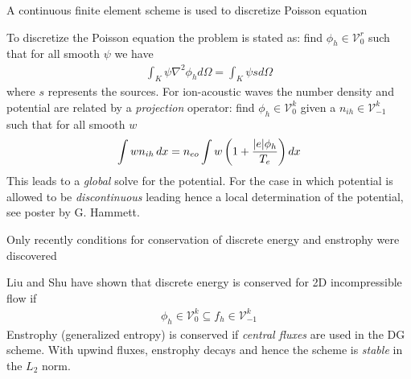 \documentclass[pdf]{beamer}
\theoremstyle{definition}
\begin{document}
\begin{frame}{A continuous finite element scheme is used to discretize
    Poisson equation}

  To discretize the Poisson equation the problem is stated as: find
  $\phi_h \in \mathcal{V}^r_0$ such that for all smooth $\psi$ we have
  \begin{align*}
    \int_K \psi \nabla^2 \phi_h d\Omega = \int_K \psi s d\Omega
  \end{align*}
  where $s$ represents the sources. For ion-acoustic waves the number
  density and potential are related by a \emph{projection} operator:
  find $\phi_h \in \mathcal{V}^k_0$ given a $n_{ih} \in
  \mathcal{V}_{-1}^k$ such that for all smooth $w$
  \begin{align*}
    \int w n_{ih}\thinspace dx = 
    n_{eo}\int w \left(1 + \frac{|e|\phi_h}{T_e}\right) dx
  \end{align*}
  This leads to a \emph{global} solve for the potential. For the case
  in which potential is allowed to be \emph{discontinuous} leading
  hence a local determination of the potential, see poster by
  G. Hammett.
\end{frame}

\begin{frame}{Only recently conditions for conservation of discrete
    energy and enstrophy were discovered}%

  Liu and Shu have shown that discrete
  energy is conserved for 2D incompressible flow if
  \begin{align*}
    \phi_h \in \mathcal{V}_0^k \subseteq f_h \in \mathcal{V}^k_{-1}
  \end{align*}
  Enstrophy (generalized entropy) is conserved if \emph{central
    fluxes} are used in the DG scheme. With upwind fluxes, enstrophy
  decays and hence the scheme is \emph{stable} in the $L_2$ norm.
\end{frame}
\end{document}
